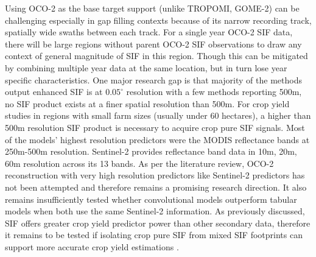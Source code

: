 Using OCO-2 as the base target support (unlike TROPOMI, GOME-2) can be challenging especially in gap filling contexts because of its narrow recording track, spatially wide swaths between each track. For a single year OCO-2 SIF data, there will be large regions without parent OCO-2 SIF observations to draw any context of general magnitude of SIF in this region. Though this can be mitigated by combining multiple year data at the same location, but in turn lose year specific characteristics. One major research gap is that majority of the methods output enhanced SIF is at \(0.05^\circ\) resolution with a few methods reporting 500m, no SIF product exists at a finer spatial resolution than 500m. For crop yield studies in regions with small farm sizes (usually under 60 hectares), a higher than 500m resolution SIF product is necessary to acquire crop pure SIF signals. Most of the models' highest resolution predictors were the MODIS reflectance bands at 250m-500m resolution. Sentinel-2 provides reflectance band data in 10m, 20m, 60m resolution across its 13 bands. As per the literature review, OCO-2 reconstruction with very high resolution predictors like Sentinel-2 predictors has not been attempted and therefore remains a promising research direction.  It also remains insufficiently tested whether convolutional models outperform tabular models when both use the same Sentinel-2 information. As previously discussed, SIF offers greater crop yield predictor power than other secondary data, therefore it remains to be tested if isolating crop pure SIF from mixed SIF footprints can support more accurate crop yield estimations \cite{qiu2022monitoring,song2018satellite,peng2020assessing}. 

\clearpage
\newlength{\cropyieldtablewidth}
\setlength{\cropyieldtablewidth}{\linewidth}

\begingroup
\tiny
\setlength{\tabcolsep}{1pt}
\renewcommand{\arraystretch}{1.10}
\setlength{\LTcapwidth}{\cropyieldtablewidth}

